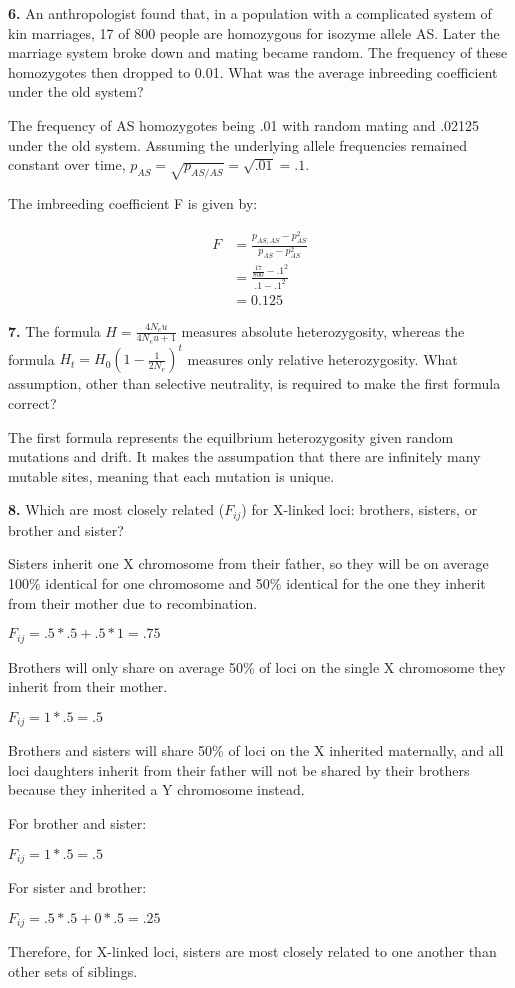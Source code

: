 \documentclass{essay}
\begin{document}
\begin{essaystyle}
\textbf{6.} An anthropologist found that, in a population with a complicated
system of kin marriages, 17 of 800 people are homozygous for isozyme allele AS.
Later the marriage system broke down and mating became random. The frequency of
these homozygotes then dropped to 0.01. What was the average inbreeding
coefficient under the old system?

The frequency of AS homozygotes being .01 with random mating and .02125 under
the old system. Assuming the underlying allele frequencies remained constant
over time, $p_{AS} = \sqrt{p_{AS/AS}} = \sqrt{.01} = .1$.

The imbreeding coefficient F is given by:

\begin{align}
  F &= \frac{p_{AS,AS} - p_{AS}^2}{p_{AS} - p_{AS}^2} \\
    &= \frac{\frac{17}{800} - .1^2}{.1 - .1^2} \\
    &= 0.125
\end{align}


\textbf{7.} The formula $H = \frac{4N_e u}{4N_e u + 1}$ measures absolute
heterozygosity, whereas the formula $H_t = H_0(1 - \frac{1}{2N_e})^t$ measures
only relative heterozygosity. What assumption, other than selective
neutrality, is required to make the first formula correct?

The first formula represents the equilbrium heterozygosity given random
mutations and drift. It makes the assumpation that there are infinitely many
mutable sites, meaning that each mutation is unique.


\textbf{8.} Which are most closely related ($F_{ij}$) for X-linked loci: brothers,
sisters, or brother and sister?

Sisters inherit one X chromosome from their father, so they will be on average
100\% identical for one chromosome and 50\% identical for the one they inherit
from their mother due to recombination.

$F_{ij} = .5 * .5 + .5 * 1 = .75$

Brothers will only share on average 50\% of loci on the single X chromosome
they inherit from their mother.

$F_{ij} = 1 * .5 = .5$

Brothers and sisters will share 50\% of loci on the X inherited maternally, and
all loci daughters inherit from their father will not be shared by their
brothers because they inherited a Y chromosome instead.

For brother and sister:

$F_{ij} = 1 * .5 = .5$

For sister and brother:

$F_{ij} = .5 * .5 + 0 * .5 = .25$

Therefore, for X-linked loci, sisters are most closely related to one another
than other sets of siblings.

\end{essaystyle}
\end{document}
